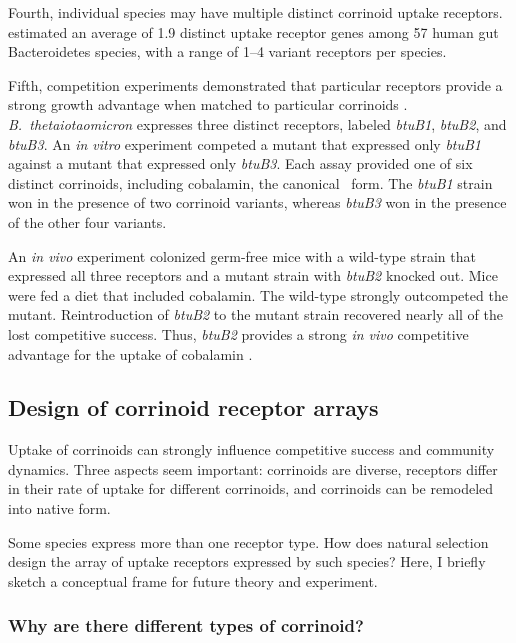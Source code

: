 \documentclass[\mydocfontsize]{article}
\begin{document}
\begin{multicols}{2}
Fourth, individual species may have multiple distinct corrinoid uptake receptors. \textcite{degnan14human} estimated an average of 1.9 distinct uptake receptor genes among 57 human gut Bacteroidetes species, with a range of 1--4 variant receptors per species. 

Fifth, competition experiments demonstrated that particular receptors provide a strong growth advantage when matched to particular corrinoids \autocite{degnan14human}. \textit{B.\ thetaiotaomicron} expresses three distinct receptors, labeled \textit{btuB1}, \textit{btuB2}, and \textit{btuB3}. An \textit{in vitro} experiment competed a mutant that expressed only \textit{btuB1} against a mutant that expressed only \textit{btuB3}. Each assay provided one of six distinct corrinoids, including cobalamin, the canonical \bt\ form. The \textit{btuB1} strain won in the presence of two corrinoid variants, whereas \textit{btuB3} won in the presence of the other four variants. 

An \textit{in vivo} experiment colonized germ-free mice with a wild-type strain that expressed all three receptors and a mutant strain with \textit{btuB2} knocked out. Mice were fed a diet that included cobalamin. The wild-type strongly outcompeted the mutant. Reintroduction of \textit{btuB2} to the mutant strain recovered nearly all of the lost competitive success. Thus, \textit{btuB2} provides a strong \textit{in vivo} competitive advantage for the uptake of cobalamin \autocite{degnan14human}. 

\subsection{Design of corrinoid receptor arrays}

Uptake of corrinoids can strongly influence competitive success and community dynamics. Three aspects seem important: corrinoids are diverse, receptors differ in their rate of uptake for different corrinoids, and corrinoids can be remodeled into native form.

Some species express more than one receptor type. How does natural selection design the array of uptake receptors expressed by such species? Here, I briefly sketch a conceptual frame for future theory and experiment.

\subsubsection{Why are there different types of corrinoid?}


\end{multicols}
\end{document}

